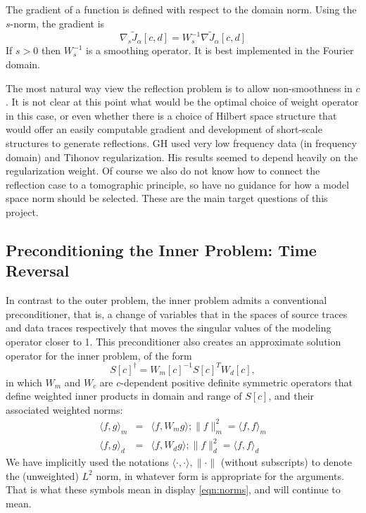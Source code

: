 The gradient of a function is defined with respect to the domain norm. Using the $s$-norm, the gradient is
\begin{equation}
\label{eqn:grads}
\nabla_s \tilde{J}_{\alpha}[c,d] = W_s^{-1}\nabla \tilde{J}_{\alpha}[c,d]
\end{equation}
If $s>0$ then $W_s^{-1}$ is a smoothing operator. It is best implemented in the Fourier domain.

The most natural way view the reflection problem is to allow non-smoothness in $c$. It is not clear at this point what would be the optimal choice of weight operator in this case, or even whether there is a choice of Hilbert space structure that would offer an easily computable gradient and development of short-scale structures to generate reflections. GH used very low frequency data (in frequency domain) and Tihonov regularization. His results seemed to depend heavily on the regularization weight. Of course we also do not know how to connect the reflection case to a tomographic principle, so have no guidance for how a model space norm should be selected. These are the main target questions of this project.

\subsection{Preconditioning the Inner Problem: Time Reversal}
In contrast to the outer problem, the inner problem admits a conventional preconditioner, that is, a change of variables that in the spaces of source traces and data traces respectively that moves the singular values of the modeling operator closer to 1. This preconditioner also creates an approximate solution operator for the inner problem, of the form
\begin{equation}
\label{eqn:appinv}
S[c]^{\dagger} = W_m[c]^{-1}S[c]^TW_d[c],
\end{equation}
in which $W_m$ and $W_c$ are $c$-dependent positive definite symmetric operators that define weighted inner products in domain and range of $S[c]$, and their associated weighted norms:
\begin{eqnarray}
\label{eqn:norms}
\langle f,g \rangle_m & = & \langle f, W_mg\rangle; \|f\|_m^2 = \langle f,f\rangle_m \nonumber \\
\langle f,g \rangle_d & = & \langle f, W_d g\rangle; \|f\|_d^2 = \langle f,f \rangle_d
\end{eqnarray}
We have implicitly used the notations $\langle \cdot,\cdot \rangle, \|\cdot \|$ (without subscripts) to denote the (unweighted) $L^2$ norm, in whatever form is appropriate for the arguments. That is what these symbols mean in display \ref{eqn:norms}, and will continue to mean.

